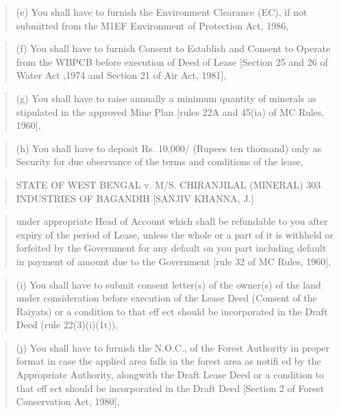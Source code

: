 \documentclass[12pt,a4paper]{article}
\newenvironment{judgequote}
  {\begin{quote}\small}
  {\end{quote}}
\begin{document}
\begin{judgequote}
(e) You shall have to furnish the Environment Clearance (EC), if not
submitted from the M1EF Environment of Protection Act, 1986,
\end{judgequote}

\begin{judgequote}
(f) You shall have to furnish Consent to Establish and Consent to
Operate from the WBPCB before execution of Deed of Lease [Section
25 and 26 of Water Act ,1974 and Section 21 of Air Act, 1981],
\end{judgequote}

\begin{judgequote}
(g) You shall have to raise annually a minimum quantity of minerals
as stipulated in the approved Mine Plan [rules 22A and 45(ia) of MC
Rules, 1960],
\end{judgequote}

\begin{judgequote}
(h) You shall have to deposit Rs. 10,000/ (Rupees ten thousand) only
as Security for due observance of the terms and conditions of the lease,
\end{judgequote}



\begin{judgequote}
STATE OF WEST BENGAL v. M/S. CHIRANJILAL (MINERAL) 303
INDUSTRIES OF BAGANDIH [SANJIV KHANNA, J.]
\end{judgequote}

\begin{judgequote}
under appropriate Head of Account which shall be refundable to you
after expiry of the period of Lease, unless the whole or a part of it is
withheld or forfeited by the Government for any default on you part
including default in payment of amount due to the Government [rule
32 of MC Rules, 1960],
\end{judgequote}

\begin{judgequote}
(i) You shall have to submit consent letter(s) of the owner(s) of the
land under consideration before execution of the Lease Deed (Consent
of the Raiyats) or a condition to that eff ect should be incorporated in
the Draft Deed (rule 22(3)(i)(1t)),
\end{judgequote}

\begin{judgequote}
(j) You shall have to furnish the N.O.C., of the Forest Authority in
proper format in case the applied area falls in the forest area as notifi ed
by the Appropriate Authority, alongwith the Draft Lease Deed or
a condition to that eff ect should be incorporated in the Draft Deed
[Section 2 of Forest Conservation Act, 1980],
\end{judgequote}
\end{document}

